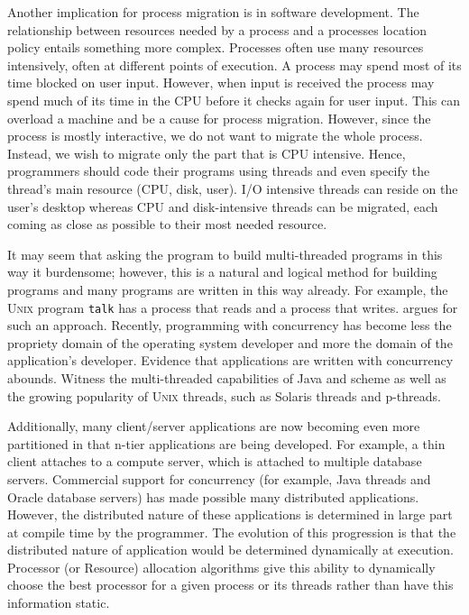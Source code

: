 \documentclass{report}
\newcommand{\UNIX}{\textsc{Unix}\xspace}
\begin{document}
Another implication for process migration is in software development.  The
relationship between resources needed by a process and a processes location
policy entails something more complex.  Processes often use many resources
intensively, often at different points of execution.  A process may spend
most of its time blocked on user input.  However, when input is received the
process may spend much of its time in the CPU before it checks again for
user input.  This can overload a machine and be a cause for process
migration.  However, since the process is mostly interactive, we do not want
to migrate the whole process.  Instead, we wish to migrate only the part
that is CPU intensive.  Hence, programmers should code their programs using
threads and even specify the thread's main resource (CPU, disk, user).  I/O
intensive threads can reside on the user's desktop whereas CPU and
disk-intensive threads can be migrated, each coming as close as possible to
their most needed resource.

It may seem that asking the program to build multi-threaded programs in this
way it burdensome; however, this is a natural and logical method for
building programs and many programs are written in this way already.  For
example, the \UNIX program \texttt{talk} has a process that reads and a
process that writes.  \cite{event_loop} argues for such an approach.
Recently, programming with concurrency has become less the propriety domain
of the operating system developer and more the domain of the application's
developer.  Evidence that applications are written with concurrency abounds.
Witness the multi-threaded capabilities of Java and scheme as well as the
growing popularity of \UNIX threads, such as Solaris threads and p-threads.

Additionally, many client/server applications are now becoming even more
partitioned in that n-tier applications are being developed.  For example, a
thin client attaches to a compute server, which is attached to multiple
database servers.  Commercial support for concurrency (for example, Java
threads and Oracle database servers) has made possible many distributed
applications.  However, the distributed nature of these applications is
determined in large part at compile time by the programmer.  The evolution
of this progression is that the distributed nature of application would be
determined dynamically at execution.  Processor (or Resource) allocation
algorithms give this ability to dynamically choose the best processor for a
given process or its threads rather than have this information static.
\end{document}
